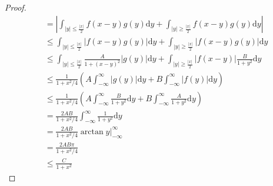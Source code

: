 \documentclass{article}
\begin{document}
\begin{enumerate}
\begin{proof}
\begin{equation}
\begin{aligned}
                &=\left|\int_{|y|\leq\frac{|x|}{2}}f(x-y)g(y)\mathrm{d}y+\int_{|y|\geq\frac{|x|}{2}}f(x-y)g(y)\mathrm{d}y\right| \\
                &\leq\int_{|y|\leq\frac{|x|}{2}}|f(x-y)g(y)|\mathrm{d}y+\int_{|y|\geq\frac{|x|}{2}}|f(x-y)g(y)|\mathrm{d}y \\
                &\leq\int_{|y|\leq\frac{|x|}{2}}\frac{A}{1+(x-y)^2}|g(y)|\mathrm{d}y+\int_{|y|\geq\frac{|x|}{2}}|f(x-y)|\frac{B}{1+y^2}\mathrm{d}y \\
                &\leq\frac{1}{1+x^2/4}\left(A\int_{-\infty}^{\infty}|g(y)|\mathrm{d}y+B\int_{-\infty}^{\infty}|f(y)|\mathrm{d}y\right) \\
                &\leq\frac{1}{1+x^2/4}\left(A\int_{-\infty}^{\infty}\frac{B}{1+y^2}\mathrm{d}y+B\int_{-\infty}^{\infty}\frac{A}{1+y^2}\mathrm{d}y\right) \\
                &=\frac{2AB}{1+x^2/4}\int_{-\infty}^{\infty}\frac{1}{1+y^2}\mathrm{d}y \\
                &=\frac{2AB}{1+x^2/4}\arctan y\bigg|_{-\infty}^{\infty} \\
                &=\frac{2AB\pi}{1+x^2/4} \\
                &\leq\frac{C}{1+x^2}
            \end{aligned}
            \nonumber
        \end{equation}
    \end{proof}
\end{enumerate}
\end{document}
